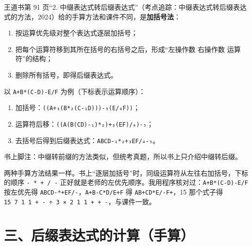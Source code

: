 \documentclass[10.5pt,a4paper,oneside]{article}
\newcommand{\uln}[1]{\CJKunderline[format=\color{wdred},thickness=0.9pt,depth=0.28em]{#1}}
\providecommand{\tightlist}{\setlength{\itemsep}{2pt}\setlength{\parskip}{0pt}}
\begin{document}
\begin{bookbox}

王道书第 91 页“2.
中缀表达式转后缀表达式”（考点追踪：中缀表达式转后缀表达式的方法，2024）给的手算方法和课件不同，是\textbf{加括号法}：

\begin{enumerate}
\def\labelenumi{\arabic{enumi}.}
\tightlist
\item
  按运算优先级对整个表达式逐层加括号；
\item
  把每个运算符移到其所在括号的右括号之后，形成“左操作数 右操作数
  运算符”的结构；
\item
  删除所有括号，即得后缀表达式。
\end{enumerate}

以 \texttt{A+B*(C-D)-E/F} 为例（下标表示运算顺序）：

\begin{enumerate}
\def\labelenumi{\arabic{enumi}.}
\tightlist
\item
  加括号：\texttt{((A+₃(B*₂(C-₁D)))-₅(E/₄F))}；
\item
  运算符后移：\texttt{((A(B(CD)-₁)*₂)+₃(EF)/₄)-₅}；
\item
  去括号后得到后缀表达式：\texttt{ABCD-₁*₂+₃EF/₄-₅}。
\end{enumerate}

书上脚注：中缀转前缀的方法类似，但统考真题\uln{仅考查过中缀转后缀}，所以书上只介绍中缀转后缀。

\end{bookbox}

\begin{addbox}

两种手算方法结果一样。书上“逐层加括号”时，同级运算符从左往右加括号，下标的顺序
\texttt{-\ *\ +\ /\ -}
正好就是老师的左优先顺序。我用程序核对过：\texttt{A+B*(C-D)-E/F}
按左优先得 \texttt{ABCD-*+EF/-}，\texttt{A+B-C*D/E+F} 得
\texttt{AB+CD*E/-F+}，15 那个式子得
\texttt{15\ 7\ 1\ 1\ +\ -\ ÷\ 3\ ×\ 2\ 1\ 1\ +\ +\ -}，与课件一致。

\end{addbox}

\hypertarget{ux4e09ux540eux7f00ux8868ux8fbeux5f0fux7684ux8ba1ux7b97ux624bux7b97}{%
\section{三、后缀表达式的计算（手算）}\label{ux4e09ux540eux7f00ux8868ux8fbeux5f0fux7684ux8ba1ux7b97ux624bux7b97}}

\end{document}
